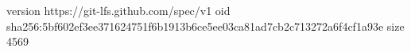 version https://git-lfs.github.com/spec/v1
oid sha256:5bf602ef3ee371624751f6b1913b6ce5ee03ca81ad7cb2c713272a6f4cf1a93e
size 4569
